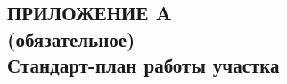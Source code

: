 \renewcommand{\thefigure}{\Asbuk{section}.\arabic{figure}}
\renewcommand{\thetable}{\Asbuk{section}.\arabic{table}}
\renewcommand{\thelstlisting}{\Asbuk{section}.\arabic{lstlisting}}

\begin{landscape}
\section*{%
  ПРИЛОЖЕНИЕ A \\ 
  (обязательное) \\ 
  Стандарт-план работы участка
}
\label{sec:appendix_a}

\pagestyle{fancy}
\fancyhf{}  %
\fancyfoot[R]{\thepage}
\renewcommand{\headrulewidth}{0pt}
\renewcommand{\footrulewidth}{0pt}

\setlength{\headheight}{10mm}
\setlength{\headsep}{\baselineskip}

\thispagestyle{plain}

\setcounter{section}{1}
\setcounter{figure}{0}
\setcounter{table}{0}
\setcounter{lstlisting}{0}


\end{landscape}
